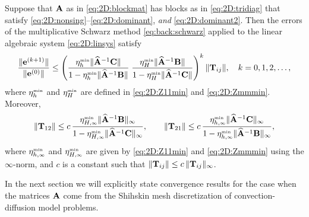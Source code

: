 \begin{thm}\label{thm:2D:main2}
Suppose that $\mathbf{A}$ as in \eqref{eq:2D:blockmat} has blocks as in
\eqref{eq:2D:tridiag} that satisfy \eqref{eq:2D:nonsing}--\eqref{eq:2D:dominant}, \emph{and} \eqref{eq:2D:dominant2}. Then the errors of
the  multiplicative Schwarz method \eqref{eq:back:schwarz} applied to the
linear algebraic system \eqref{eq:2D:linsys} satisfy
%
$$\frac{\|\mathbf{e}^{(k+1)}\|}{\|\mathbf{e}^{(0)}\|} \leq
\left(\frac{\eta_h^{\scriptscriptstyle \min} \|\widehat{\mathbf{A}}^{-1}\mathbf{C}\|}{1-\eta_h^{\scriptscriptstyle \min}
\|\widehat{\mathbf{A}}^{-1}\mathbf{B}\|}\;
\frac{\eta_H^{\scriptscriptstyle \min}\|\widehat{\mathbf{A}}^{-1}\mathbf{B}\|}{1-
\eta_H^{\scriptscriptstyle \min}\|\widehat{\mathbf{A}}^{-1}\mathbf{C}\|}\right)^k\|\mathbf{T}_{ij}\|,
\quad k=0,1,2,\dots,$$
%
where $\eta_h^{\scriptscriptstyle \min}$ and $\eta_H^{\scriptscriptstyle \min}$ are defined in
\eqref{eq:2D:Z11min} and \eqref{eq:2D:Zmmmin}. Moreover,
$$
	\| \T_{12} \| \leq
	c\, \frac{\eta_{H,\klein{\infty}}^{\klein{\min}}
  \|\matA^{-1}\matB\|_{\infty}}{1-\eta_{H,\klein{\infty}}^{\klein{\min}}
  \|\matA^{-1}\matC\|_{\infty}}  ,\qquad
%
	\| \T_{21} \| \leq
	c\, \frac{\eta_{h,\klein{\infty}}^{\klein{\min}}
  \|\matA^{-1}\matC\|_{\infty}}{1-\eta_{h,\klein{\infty}}^{\klein{\min}}
  \|\matA^{-1}\matB\|_{\infty}},
$$
where $\eta_{h,\scriptscriptstyle \infty}^{\scriptscriptstyle \min}$ and
$\eta_{H,\scriptscriptstyle \infty}^{\scriptscriptstyle \min}$ are given by \eqref{eq:2D:Z11min} and
\eqref{eq:2D:Zmmmin} using the $\infty$-norm, and $c$ is a constant such that
$\|\mathbf{T}_{ij}\| \leq c\, \|\mathbf{T}_{ij}\|_\infty$.
%
\end{thm}

In the next section we will explicitly state convergence results for the case
when the matrices $\mathbf{A}$ come from the Shihskin mesh discretization of
convection-diffusion model problems.

